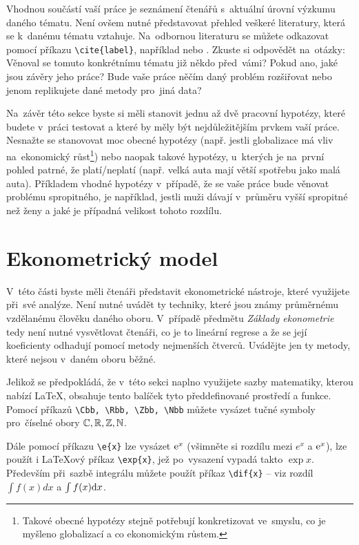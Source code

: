 \documentclass[12pt,a4paper,oneside,final]{article}
\theoremstyle{definition}
\theoremstyle{remark}
\numberwithin{equation}{section}
\begin{document}
Vhodnou součástí vaší práce je seznámení čtenářů s~aktuální úrovní výzkumu daného tématu. Není ovšem nutné představovat přehled veškeré literatury, která se k~danému tématu vztahuje. Na~odbornou literaturu se můžete odkazovat pomocí příkazu \verb|\cite{label}|, například  nebo . Zkuste si odpovědět na~otázky: Věnoval se tomuto konkrétnímu tématu již někdo před~vámi? Pokud ano, jaké jsou závěry jeho práce? Bude vaše práce něčím daný problém rozšiřovat nebo jenom replikujete dané metody pro~jiná data?

Na~závěr této sekce byste si měli stanovit jednu až dvě pracovní hypotézy, které budete v~práci testovat a které by měly být nejdůležitějším prvkem vaší práce. Nesnažte se stanovovat moc obecné hypotézy (např. jestli globalizace má vliv na~ekonomický růst\footnote{Takové obecné hypotézy stejně potřebují konkretizovat ve~smyslu, co je myšleno globalizací a co ekonomickým růstem.}) nebo naopak takové hypotézy, u~kterých je na~první pohled patrné, že platí/neplatí (např. velká auta mají větší spotřebu jako malá auta). Příkladem vhodné hypotézy v~případě, že se vaše práce bude věnovat problému spropitného, je například, jestli muži dávají v~průměru vyšší spropitné než ženy a jaké je případná velikost tohoto rozdílu.

\section{Ekonometrický model}

V~této části byste měli čtenáři představit ekonometrické nástroje, které využijete při~své analýze. Není nutné uvádět ty techniky, které jsou známy průměrnému vzdělanému člověku daného oboru. V~případě předmětu \emph{Základy ekonometrie} tedy není nutné vysvětlovat čtenáři, co je to lineární regrese a že se její koeficienty odhadují pomocí metody nejmenších čtverců. Uvádějte jen ty metody, které nejsou v~daném oboru běžné. 

Jelikož se předpokládá, že v~této sekci naplno využijete sazby matematiky, kterou nabízí \LaTeX{}, obsahuje tento balíček tyto předdefinované prostředí a funkce. Pomocí příkazů \verb|\Cbb, \Rbb, \Zbb, \Nbb| můžete vysázet tučné symboly pro~číselné obory $\mathbb{C}, \mathbb{R}, \mathbb{Z}, \mathbb{N}$.

Dále pomocí příkazu \verb|\e{x}| lze vysázet $\text{e}^{x}$ (všimněte si rozdílu mezi $e^x$ a $\text{e}^{x}$), lze použít i \LaTeX{ový} příkaz \verb|\exp{x}|, jež po~vysazení vypadá takto $\exp{x}$. Především při~sazbě integrálu můžete použít příkaz \verb|\dif{x}| -- viz rozdíl $\int f(x) dx$ a $\int f(x) \text{d}x$. 
\end{document}
